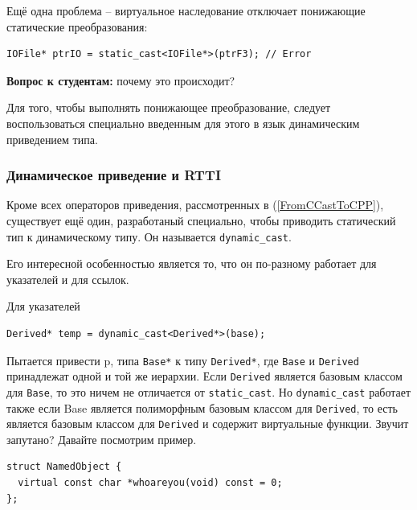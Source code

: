 \documentclass[a4paper,12pt,oneside]{article}
\newif\ifanswers
\begin{document}
Ещё одна проблема -- виртуальное наследование отключает понижающие статические преобразования:

\begin{lstlisting}
IOFile* ptrIO = static_cast<IOFile*>(ptrF3); // Error
\end{lstlisting}

\textbf{Вопрос к студентам:} почему это происходит?

\ifanswers
Правильный ответ: потому что для реконструкции объекта с виртуальным наследованием, компилятор должен пройти по каждой из возможных цепочек виртуального наследования и создать каждый из подобъектов. Это неконстантный оверхед по времени и памяти и разработчики языка не стали его закладывать в обычное преобразование.
\fi

Для того, чтобы выполнять понижающее преобразование, следует воспользоваться специально введенным для этого в язык динамическим приведением типа.

\subsubsection{Динамическое приведение и RTTI}\label{DynCastRTTI}

Кроме всех операторов приведения, рассмотренных в (\ref{FromCCastToCPP}), существует ещё один, разработаный специально, чтобы приводить статический тип к динамическому типу. Он называется \lstinline!dynamic_cast!. 

Его интересной особенностью является то, что он по-разному работает для указателей и для ссылок. 

Для указателей

\begin{lstlisting}
Derived* temp = dynamic_cast<Derived*>(base);
\end{lstlisting}

Пытается привести p, типа \lstinline!Base*! к типу \lstinline!Derived*!, где \lstinline!Base! и \lstinline!Derived! принадлежат одной и той же иерархии. Если \lstinline!Derived! является базовым классом для \lstinline!Base!, то это ничем не отличается от \lstinline!static_cast!. Но \lstinline!dynamic_cast! работает также если Base является полиморфным базовым классом для \lstinline!Derived!, то есть является базовым классом для \lstinline!Derived! и содержит виртуальные функции. Звучит запутано? Давайте посмотрим пример.

\begin{lstlisting}
struct NamedObject {
  virtual const char *whoareyou(void) const = 0;
};
\end{lstlisting}
\end{document}
